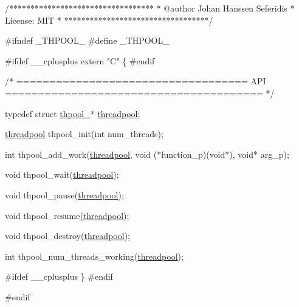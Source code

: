 \begin{DoxyCodeInclude}
\textcolor{comment}{/**********************************}
\textcolor{comment}{ * @author      Johan Hanssen Seferidis}
\textcolor{comment}{ * License:     MIT}
\textcolor{comment}{ *}
\textcolor{comment}{ **********************************/}

\textcolor{preprocessor}{#ifndef \_THPOOL\_}
\textcolor{preprocessor}{#define \_THPOOL\_}

\textcolor{preprocessor}{#ifdef \_\_cplusplus}
\textcolor{keyword}{extern} \textcolor{stringliteral}{"C"} \{
\textcolor{preprocessor}{#endif}

\textcolor{comment}{/* =================================== API ======================================= */}


\textcolor{keyword}{typedef} \textcolor{keyword}{struct }\mbox{\hyperlink{structthpool__}{thpool\_}}* \mbox{\hyperlink{structthpool__}{threadpool}};


\mbox{\hyperlink{structthpool__}{threadpool}} thpool\_init(\textcolor{keywordtype}{int} num\_threads);


\textcolor{keywordtype}{int} thpool\_add\_work(\mbox{\hyperlink{structthpool__}{threadpool}}, \textcolor{keywordtype}{void} (*function\_p)(\textcolor{keywordtype}{void}*), \textcolor{keywordtype}{void}* arg\_p);


\textcolor{keywordtype}{void} thpool\_wait(\mbox{\hyperlink{structthpool__}{threadpool}});


\textcolor{keywordtype}{void} thpool\_pause(\mbox{\hyperlink{structthpool__}{threadpool}});


\textcolor{keywordtype}{void} thpool\_resume(\mbox{\hyperlink{structthpool__}{threadpool}});


\textcolor{keywordtype}{void} thpool\_destroy(\mbox{\hyperlink{structthpool__}{threadpool}});


\textcolor{keywordtype}{int} thpool\_num\_threads\_working(\mbox{\hyperlink{structthpool__}{threadpool}});


\textcolor{preprocessor}{#ifdef \_\_cplusplus}
\}
\textcolor{preprocessor}{#endif}

\textcolor{preprocessor}{#endif}
\end{DoxyCodeInclude}
 